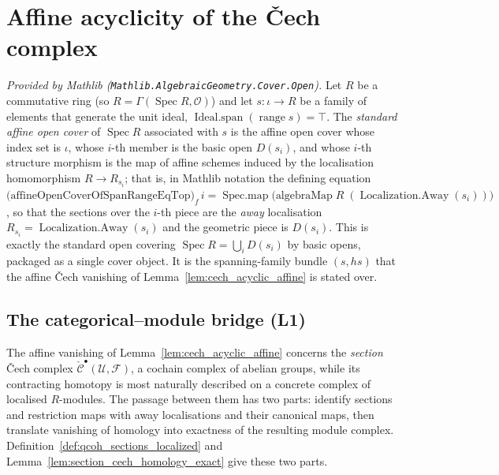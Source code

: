 \section{Affine acyclicity of the {\v C}ech complex}

\begin{definition}
  \label{def:standard_affine_cover}
  \mathlibok
  \textit{Provided by Mathlib (\texttt{Mathlib.AlgebraicGeometry.Cover.Open}).}
  Let \(R\) be a commutative ring (so \(R = \Gamma(\operatorname{Spec} R,
  \mathcal{O})\)) and let \(s : \iota \to R\) be a family of elements that generate
  the unit ideal, \(\operatorname{Ideal.span}(\operatorname{range} s) = \top\). The
  \emph{standard affine open cover} of \(\operatorname{Spec} R\) associated with
  \(s\) is the affine open cover whose index set is \(\iota\), whose \(i\)-th member
  is the basic open \(D(s_i)\), and whose \(i\)-th structure morphism is the map of
  affine schemes induced by the localisation homomorphism \(R \to R_{s_i}\); that
  is, in Mathlib notation the defining equation
  \(\bigl(\text{affineOpenCoverOfSpanRangeEqTop}\bigr)_f\, i =
  \operatorname{Spec.map}\bigl(\text{algebraMap}\; R\; (\operatorname{Localization.Away}(s_i))\bigr)\),
  so that the sections over the \(i\)-th piece are the \emph{away} localisation
  \(R_{s_i} = \operatorname{Localization.Away}(s_i)\) and the geometric piece is
  \(D(s_i)\). This is exactly the standard open covering
  \(\operatorname{Spec} R = \bigcup_i D(s_i)\) by basic opens, packaged as a single
  cover object. It is the spanning-family bundle \((s, hs)\) that the affine
  {\v C}ech vanishing of Lemma~\ref{lem:cech_acyclic_affine} is stated over.
\end{definition}

\subsection{The categorical--module bridge (L1)}
\label{sec:cech_l1_bridge}

The affine vanishing of Lemma~\ref{lem:cech_acyclic_affine} concerns the
\emph{section} {\v C}ech complex \(\check{\mathcal{C}}^\bullet(\mathcal{U},
\mathcal{F})\), a cochain complex of abelian groups, while its contracting homotopy is
most naturally described on a concrete complex of localised \(R\)-modules. The
passage between them has two parts: identify sections and restriction maps with away
localisations and their canonical maps, then translate vanishing of homology into
exactness of the resulting module complex. Definition~\ref{def:qcoh_sections_localized}
and Lemma~\ref{lem:section_cech_homology_exact} give these two parts.


